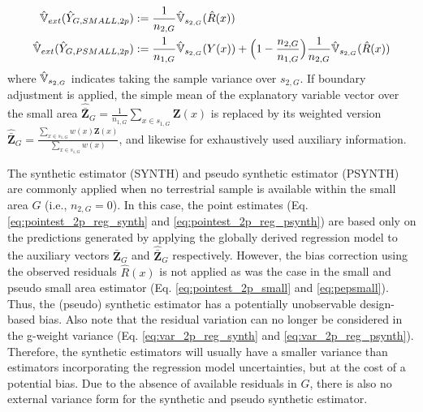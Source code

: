 \begin{subequations}\label{eq:varext_2p_small_psmall}
\begin{align}
  \hat{\mathbb{V}}_{ext}(\hat{Y}_{G,SMALL,2p}) & := \frac{1}{n_{2,G}}\hat{\mathbb{V}}_{s_{2,G}}(\hat{R}(x))  \label{eq:varext_2p_reg_small} \\
  \hat{\mathbb{V}}_{ext}(\hat{Y}_{G,PSMALL,2p}) & := \frac{1}{n_{1,G}}\hat{\mathbb{V}}_{s_{2,G}}(Y(x)) + \Big(1-\frac{n_{2,G}}{n_{1,G}}\Big)\frac{1}{n_{2,G}}\hat{\mathbb{V}}_{s_{2,G}}(\hat{R}(x)) \label{eq:varext_2p_reg_psmall}
\end{align}
\end{subequations}
where $\hat{\mathbb{V}}_{s_{2,G}}$ indicates taking the sample variance over $s_{2,G}$. If boundary adjustment is applied, the simple mean of the explanatory variable vector over the small area $\hat{\bar{\pmb{Z}}}_G=\frac{1}{n_{1,G}}\sum_{x \in s_{1,G}}\pmb{Z}(x)$ is replaced by its weighted version $\hat{\bar{\pmb{Z}}}_G=\frac{\sum_{x\in{s_{1,G}}}w(x)\pmb{Z}(x)}{\sum_{x\in{s_{1,G}}}w(x)}$, and likewise for exhaustively used auxiliary information.




The synthetic estimator (SYNTH) and pseudo synthetic estimator (PSYNTH) are commonly applied when no terrestrial sample is available within the small area $G$ (i.e., $n_{2,G}=0$). In this case, the point estimates (Eq. \ref{eq:pointest_2p_reg_synth} and \ref{eq:pointest_2p_reg_psynth}) are based only on the predictions generated by applying the globally derived regression model to the auxiliary vectors $\bar{\pmb{Z}}_G$ and $\hat{\bar{\pmb{Z}}}_G$ respectively. However, the bias correction using the observed residuals $\hat{R}(x)$ is not applied as was the case in the small and pseudo small area estimator (Eq. \ref{eq:pointest_2p_small} and \ref{eq:pepsmall}). Thus, the (pseudo) synthetic estimator has a potentially unobservable design-based bias. Also note that the residual variation can no longer be considered in the g-weight variance (Eq. \ref{eq:var_2p_reg_synth} and \ref{eq:var_2p_reg_psynth}). Therefore, the synthetic estimators will usually have a smaller variance than estimators incorporating the regression model uncertainties, but at the cost of a potential bias. Due to the absence of available residuals in $G$, there is also no external variance form for the synthetic and pseudo synthetic estimator.

